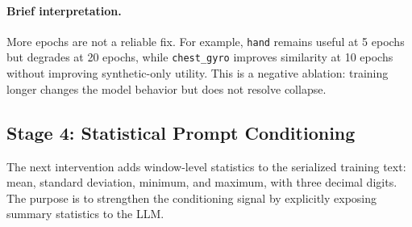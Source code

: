 \paragraph{Brief interpretation.}
More epochs are not a reliable fix. For example, \texttt{hand} remains useful at
5 epochs but degrades at 20 epochs, while \texttt{chest\_gyro} improves
similarity at 10 epochs without improving synthetic-only utility. This is a
negative ablation: training longer changes the model behavior but does not
resolve collapse.

\subsection*{Stage 4: Statistical Prompt Conditioning}

The next intervention adds window-level statistics to the serialized training
text: mean, standard deviation, minimum, and maximum, with three decimal digits.
The purpose is to strengthen the conditioning signal by explicitly exposing
summary statistics to the LLM.

\begin{table}[t]
\centering
\small
\caption{Statistical prompt results for selected channel groups and epochs.}
\label{tab:shanjun-stats}
\end{table}

